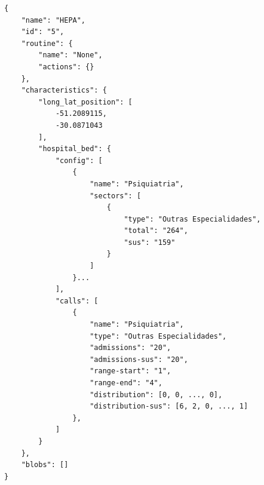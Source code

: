 \begin{listing}
\begin{verbatim}     
{
    "name": "HEPA",
    "id": "5",
    "routine": {
        "name": "None",
        "actions": {}
    },
    "characteristics": {
        "long_lat_position": [
            -51.2089115,
            -30.0871043
        ],
        "hospital_bed": {
            "config": [
                {
                    "name": "Psiquiatria",
                    "sectors": [
                        {
                            "type": "Outras Especialidades",
                            "total": "264",
                            "sus": "159"
                        }
                    ]
                }...
            ],
            "calls": [
                {
                    "name": "Psiquiatria",
                    "type": "Outras Especialidades",
                    "admissions": "20",
                    "admissions-sus": "20",
                    "range-start": "1",
                    "range-end": "4",
                    "distribution": [0, 0, ..., 0],
                    "distribution-sus": [6, 2, 0, ..., 1]
                },
            ]
        }
    },
    "blobs": []
}
\end{verbatim}
\caption{Exemplo da estrutura interna de um nodo dentro do modelo de simulação.} 
\label{nodo-structure}
\end{listing}

